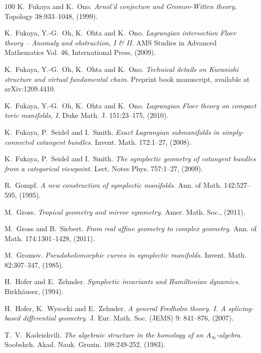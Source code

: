 \documentclass[11pt,a4paper]{article}
\numberwithin{equation}{section}
\begin{document}
\begin{thebibliography}{100}
K.~Fukaya and K.~Ono.
\emph{Arnol'd conjecture and Gromov-Witten theory.}
Topology 38:933--1048, (1999).

K.~Fukaya, Y.-G.~Oh, K.~Ohta and K.~Ono.
\emph{Lagrangian intersection Floer theory -- Anomaly and obstruction, I \& II.}
AMS Studies in Advanced Mathematics Vol. 46, International Press, (2009).

K.~Fukaya, Y.-G.~Oh, K.~Ohta and K.~Ono.
\emph{Technical details on Kuranishi structure and virtual fundamental chain.}
Preprint book manuscript, available at arXiv:1209.4410.

K.~Fukaya, Y.-G.~Oh, K.~Ohta and K.~Ono.
\emph{Lagrangian Floer theory on compact toric manifolds, I.}
Duke Math. J. 151:23--175,  (2010).

K.~Fukaya, P.~Seidel and I.~Smith.
\emph{Exact Lagrangian submanifolds in simply-connected cotangent bundles.}
Invent. Math. 172:1--27, (2008).

K.~Fukaya, P.~Seidel and I.~Smith.
\emph{The symplectic geometry of cotangent bundles from a categorical viewpoint.}
Lect. Notes Phys. 757:1--27, (2009).

R.~Gompf.
\emph{A new construction of symplectic manifolds.}
Ann. of Math. 142:527--595, (1995).

M.~Gross.
\emph{Tropical geometry and mirror symmetry.}
Amer. Math. Soc., (2011).

M.~Gross and B.~Siebert.
\emph{From real affine geometry to complex geometry.}
Ann. of Math. 174:1301--1428, (2011).

M.~Gromov.
\emph{Pseudoholomorphic curves in symplectic manifolds.}
Invent. Math. 82:307--347, (1985).


H.~Hofer and E.~Zehnder.
\emph{Symplectic invariants and Hamiltonian dynamics.}
Birkh\"auser, (1994).

H.~Hofer, K.~Wysocki and  E.~Zehnder.
\emph{A general Fredholm theory. I. A splicing-based differential geometry.}
J. Eur. Math. Soc. (JEMS) 9: 841--876, (2007).

T.~V.~Kadeishvili.
\emph{The algebraic structure in the homology of an $A_{\infty}$-algebra.}
Soobshch. Akad. Nauk. Gruzin. 108:249-252, (1983).


\end{thebibliography}
\end{document}
